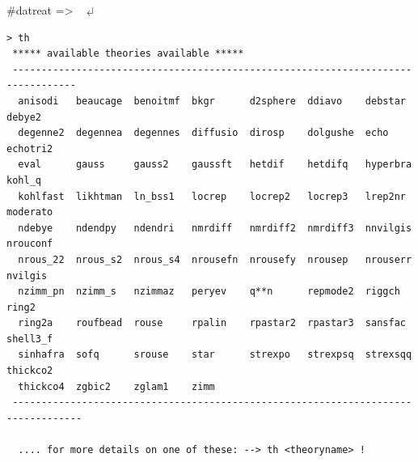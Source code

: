 \documentclass[11pt,fleqn]{book} %
\newcommand{\return}{$\carriagereturn$} %
\newcommand{\sysprompt}{{\color{green}...\textgreater} ~ }
\newcommand{\dtrprompt}{{\color{blue}\#datreat =\textgreater} ~ }
\newcommand{\enter}[1]{{\color{red} \bf #1}}
\newcommand{\cmdl}[2]{{\color{red}{\bf \underline{#1} #2}}}
\begin{document}
\begin{corollary}
\dtrprompt \cmdl{th}{}   \return
\color{blue}
\footnotesize
\begin{verbatim}
> th
 ***** available theories available *****
 ---------------------------------------------------------------------------------
  anisodi   beaucage  benoitmf  bkgr      d2sphere  ddiavo    debstar   debye2  
  degenne2  degennea  degennes  diffusio  dirosp    dolgushe  echo      echotri2
  eval      gauss     gauss2    gaussft   hetdif    hetdifq   hyperbra  kohl_q  
  kohlfast  likhtman  ln_bss1   locrep    locrep2   locrep3   lrep2nr   moderato
  ndebye    ndendpy   ndendri   nmrdiff   nmrdiff2  nmrdiff3  nnvilgis  nrouconf
  nrous_22  nrous_s2  nrous_s4  nrousefn  nrousefy  nrousep   nrouserr  nvilgis 
  nzimm_pn  nzimm_s   nzimmaz   peryev    q**n      repmode2  riggch    ring2   
  ring2a    roufbead  rouse     rpalin    rpastar2  rpastar3  sansfac   shell3_f
  sinhafra  sofq      srouse    star      strexpo   strexpsq  strexsqq  thickco2
  thickco4  zgbic2    zglam1    zimm    
 ----------------------------------------------------------------------------------

  .... for more details on one of these: --> th <theoryname> ! 
\end{verbatim}
\normalsize
\color{black} 
\end{corollary}
\end{document}

